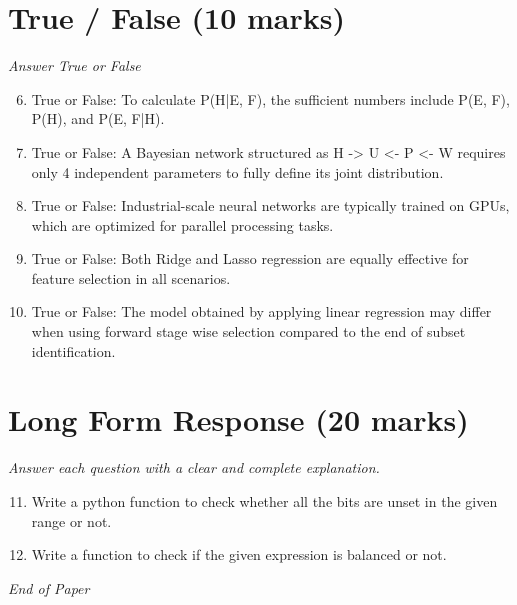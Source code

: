 \documentclass[12pt]{article}
\begin{document}
\section*{True / False (10 marks)}
\textit{Answer True or False}
\begin{enumerate}[label=\arabic*.]
\setcounter{enumi}{5}
\item True or False: To calculate P(H|E, F), the sufficient numbers include P(E, F), P(H), and P(E, F|H).
\item True or False: A Bayesian network structured as H -\textgreater{} U \textless{}- P \textless{}- W requires only 4 independent parameters to fully define its joint distribution.
\item True or False: Industrial-scale neural networks are typically trained on GPUs, which are optimized for parallel processing tasks.
\item True or False: Both Ridge and Lasso regression are equally effective for feature selection in all scenarios.
\item True or False: The model obtained by applying linear regression may differ when using forward stage wise selection compared to the end of subset identification.
\end{enumerate}

\section*{Long Form Response (20 marks)}
\textit{Answer each question with a clear and complete explanation.}
\begin{enumerate}[label=\arabic*.]
\setcounter{enumi}{10}
\item Write a python function to check whether all the bits are unset in the given range or not.
\item Write a function to check if the given expression is balanced or not.
\end{enumerate}

\vfill
\noindent\textit{End of Paper}
\end{document}
